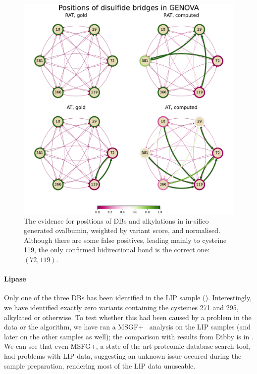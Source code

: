 \begin{figure}
  \centering
  \includegraphics[width=1\linewidth]{img/genova.pdf}
  \caption{The evidence for positions of DBs and alkylations in in-silico generated ovalbumin, weighted by variant score, and normalised. Although there are some false positives, leading mainly to cysteine 119, the only confirmed bidirectional bond is the correct one: \((72, 119)\). }\label{fig:genova}
\end{figure}

\paragraph{Lipase} Only one of the three DBs has been identified in the LIP sample (). Interestingly, we have identified exactly zero variants containing the cysteines 271 and 295, alkylated or otherwise. To test whether this had been caused by a problem in the data or the algorithm, we have ran a MSGF+~\cite{kim2014ms} analysis on the LIP samples (and later on the other samples as well); the comparison with results from Dibby is in . We can see that even MSFG+, a state of the art proteomic database search tool, had problems with LIP data, suggesting an unknown issue occured during the sample preparation, rendering most of the LIP data unuseable.


